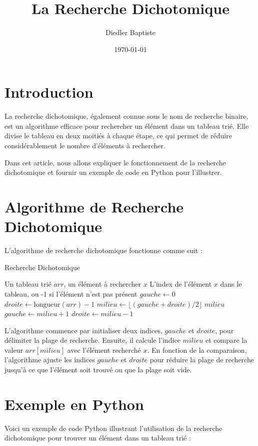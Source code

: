 \documentclass{article}
\title{La Recherche Dichotomique}
\author{Diedler Baptiste}
\date{\today}
\begin{document}
\maketitle

\section{Introduction}
La recherche dichotomique, également connue sous le nom de recherche binaire, est un algorithme efficace pour rechercher un élément dans un tableau trié. Elle divise le tableau en deux moitiés à chaque étape, ce qui permet de réduire considérablement le nombre d'éléments à rechercher. 

Dans cet article, nous allons expliquer le fonctionnement de la recherche dichotomique et fournir un exemple de code en Python pour l'illustrer.

\section{Algorithme de Recherche Dichotomique}

L'algorithme de recherche dichotomique fonctionne comme suit :

\begin{algorithm}
\caption{Recherche Dichotomique}
\begin{algorithmic}
\REQUIRE Un tableau trié $arr$, un élément à rechercher $x$
\ENSURE L'index de l'élément $x$ dans le tableau, ou -1 si l'élément n'est pas présent
\STATE $gauche \gets 0$
\STATE $droite \gets \text{longueur}(arr) - 1$
    \STATE $milieu \gets \lfloor (gauche + droite) / 2 \rfloor$
        \RETURN $milieu$
        \STATE $gauche \gets milieu + 1$
    \ELSE
        \STATE $droite \gets milieu - 1$
    \ENDIF
\ENDWHILE
{}
\end{algorithmic}
\end{algorithm}

L'algorithme commence par initialiser deux indices, $gauche$ et $droite$, pour délimiter la plage de recherche. Ensuite, il calcule l'indice $milieu$ et compare la valeur $arr[milieu]$ avec l'élément recherché $x$. En fonction de la comparaison, l'algorithme ajuste les indices $gauche$ et $droite$ pour réduire la plage de recherche jusqu'à ce que l'élément soit trouvé ou que la plage soit vide.

\section{Exemple en Python}
Voici un exemple de code Python illustrant l'utilisation de la recherche dichotomique pour trouver un élément dans un tableau trié :
\end{document}
